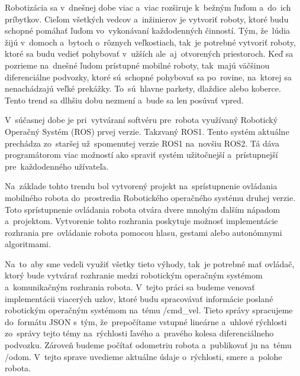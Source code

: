 
Robotizácia sa v~dnešnej dobe viac a~viac rozširuje k~bežným ľuďom a~do~ich príbytkov. Cieľom všetkých vedcov
a~inžinierov je vytvoriť roboty, ktoré budu schopné pomáhať ľuďom vo~vykonávaní každodenných činností. Tým,
že~lúdia žijú v~domoch a~bytoch o~rôznych veľkostiach, tak~je potrebné vytvoriť roboty, ktoré sa budu vedieť
pohybovať v~užších ale~aj~otvorených priestoroch. Keď sa pozrieme na~dnešné ľudom prístupné mobilné roboty,
tak~majú väčšinou diferenciálne podvozky, ktoré sú~schopné pohybovať sa po~rovine, na~ktorej sa nenachádzajú veľké
prekážky. To~sú~hlavne parkety, dlaždice alebo koberce. Tento trend sa dlhšiu dobu nezmení a~bude sa len posúvať
vpred.

V~súčasnej dobe je pri~vytváraní softvéru pre~robota využívaný Robotický Operačný Systém (ROS) prvej verzie. Takzvaný
ROS1. Tento systém aktuálne prechádza zo~staršej už~spomenutej verzie ROS1 na~novšiu ROS2. Tá dáva programátorom viac
možností ako spraviť systém užitočnejší a~prístupnejší pre~každodenného užívateľa.

Na~základe tohto trendu bol vytvorený projekt na~sprístupnenie ovládania mobilného robota do~prostredia Robotického
operačného systému druhej verzie. Toto sprístupnenie ovládania robota otvára dvere mnohým ďalším nápadom a~projektom.
Vytvorenie tohto rozhrania poskytuje možnosť implementácie rozhrania pre~ovládanie robota pomocou hlasu, gestami alebo
autonómnymi algoritmami.

Na~to~aby sme vedeli využiť všetky tieto výhody, tak~je potrebné mať ovládač, ktorý bude vytvárať rozhranie medzi
robotickým operačným systémom a~komunikačným rozhrania robota. V~tejto práci sa budeme venovať implementácii viacerých
uzlov, ktoré budu spracovávať informácie poslané robotickým operačným systémom na~tému /cmd\_vel. Tieto správy spracujeme
do~formátu JSON s~tým, že~prepočítame vstupné lineárne a~uhlové rýchlosti zo~správy tejto témy na~rýchlosti ľavého
a~pravého kolesa diferenciálneho podvozku. Zároveň budeme počítať odometriu robota a~publikovať ju na~tému /odom.
V~tejto sprave uvedieme aktuálne údaje o~rýchlosti, smere a~polohe robota.
